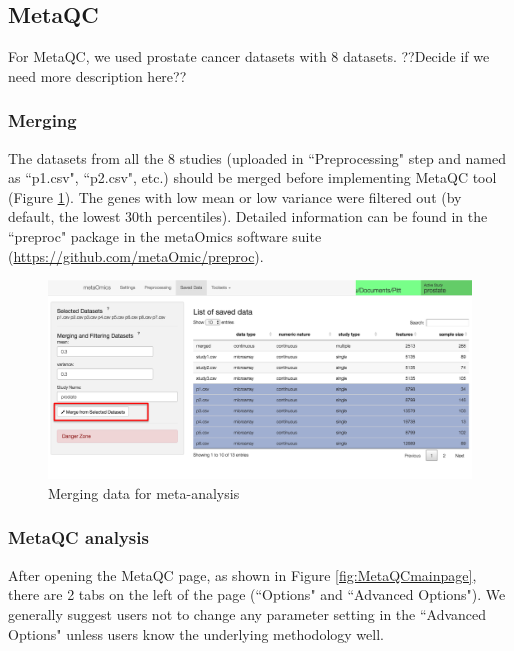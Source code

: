 \subsection{MetaQC}
For MetaQC, we used prostate cancer datasets with 8 datasets.
??Decide if we need more description here??

\subsubsection{Merging}

The datasets from all the 8 studies (uploaded in ``Preprocessing" step and named as ``p1.csv", ``p2.csv", etc.) should be merged before implementing MetaQC tool (Figure \ref{fig:merge}). The genes with low mean or low variance were filtered out (by default, the lowest 30th percentiles). Detailed information can be found in the ``preproc" package in the metaOmics software suite (\url{https://github.com/metaOmic/preproc}).

\begin{figure}[H]
\begin{center}
\includegraphics[scale=0.4]{./figure/metaQC/merge2}
\caption{Merging data for meta-analysis}
\label{fig:merge}
\end{center}
\end{figure}

\subsubsection{MetaQC analysis}

After opening the MetaQC page, as shown in Figure \ref{fig:MetaQCmainpage}, there are 2 tabs on the left of the page (``Options" and ``Advanced Options"). We generally suggest users not to change any parameter setting in the ``Advanced Options" unless users know the underlying methodology well. 

